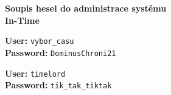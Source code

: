 \documentclass[11pt,a4paper]{article}
\begin{document}
\begin{center}
    {\LARGE \bfseries Soupis hesel do administrace systému\\ In-Time}\\[2cm]

    \begin{tcolorbox}[mybox,title=Linux login]
        \begin{spacing}{1.2}
        \textbf{User:} \texttt{vybor\_casu}\\
        \textbf{Password:} \texttt{DominusChroni21}
        \end{spacing}
    \end{tcolorbox}

    \begin{tcolorbox}[mybox,title=System login]
        \begin{spacing}{1.2}
        \textbf{User:} \texttt{timelord}\\
        \textbf{Password:} \texttt{tik\_tak\_tiktak}
        \end{spacing}
    \end{tcolorbox}
\end{center}
\end{document}
